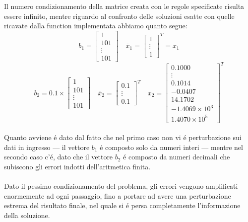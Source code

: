 \noindent Il numero condizionamento della matrice creata con le regole specificate risulta essere infinito, mentre riguardo al confronto delle soluzioni esatte con quelle ricavate dalla function implementata abbiamo quanto segue:
\[
b_1 = \begin{bmatrix}1\\101\\\vdots \\101 \end{bmatrix} \quad \overline{x}_1=\begin{bmatrix}1\\\vdots \\1 \end{bmatrix}^T = x_1
\]
\[
b_2 = 0.1 \times \begin{bmatrix}1\\101\\\vdots \\101 \end{bmatrix} \quad \overline{x}_2=\begin{bmatrix}0.1\\\vdots \\0.1 \end{bmatrix}^T \quad x_2=\begin{bmatrix}0.1000\\ \vdots \\ 0.1014 \\ -0.0407 \\ 14.1702 \\ -1.4069 \times 10^3 \\ 1.4070 \times 10^5 \end{bmatrix}^T
\]
\\
Quanto avviene \'e dato dal fatto che nel primo caso non vi \'e perturbazione sui dati in ingresso --- il vettore \(b_1\) \'e composto solo da numeri interi --- mentre nel secondo caso c'\'e, dato che il vettore \(b_2\) \'e composto da numeri decimali che subiscono gli errori indotti dell'aritmetica finita.
\\
\\
\noindent Dato il pessimo condizionamento del problema, gli errori vengono amplificati enormemente ad ogni passaggio, fino a portare ad avere una perturbazione estrema del risultato finale, nel quale si \'e persa completamente l'informazione della soluzione.
